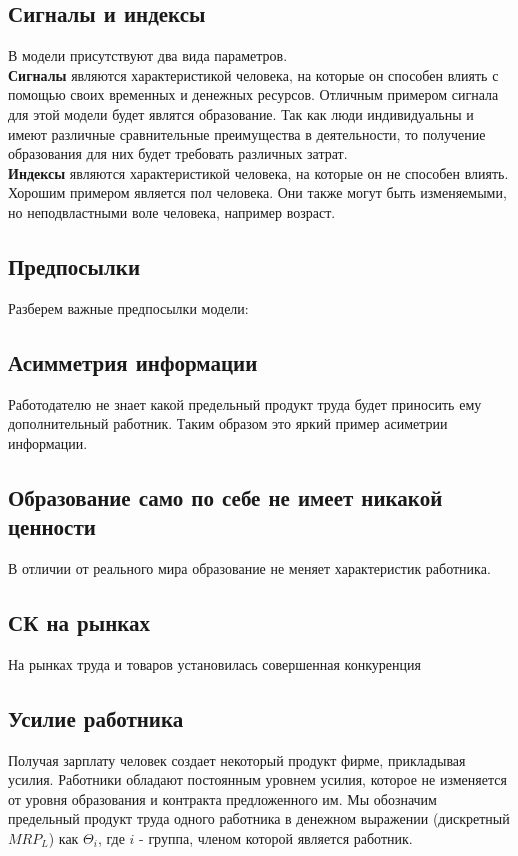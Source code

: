 \subsection{Сигналы и индексы}
\indent\setlength{\parindent}{1em}В модели присутствуют два вида параметров.\smallskip\\
\indent\setlength{\parindent}{1em}\textbf{Сигналы} являются характеристикой человека, на которые он способен влиять с помощью своих временных и денежных ресурсов. Отличным примером сигнала для этой модели будет являтся образование. Так как люди индивидуальны и имеют различные сравнительные преимущества в деятельности, то получение образования для них будет требовать различных затрат.\smallskip\\
\indent\setlength{\parindent}{1em}\textbf{Индексы} являются характеристикой человека, на которые он не способен влиять. Хорошим примером является пол человека. Они также могут быть изменяемыми, но неподвластными воле человека, например возраст.
\subsection{Предпосылки}
\indent\setlength{\parindent}{1em}Разберем важные предпосылки модели:
\subsection{Асимметрия информации}
\indent\setlength{\parindent}{1em}Работодателю не знает какой предельный продукт труда будет приносить ему дополнительный работник. Таким образом это яркий пример асиметрии информации.
\subsection{Образование само по себе не имеет никакой ценности}
\indent\setlength{\parindent}{1em}В отличии от реального мира образование не меняет характеристик работника.
\subsection{СК на рынках}
\indent\setlength{\parindent}{1em}На рынках труда и товаров установилась совершенная конкуренция
\subsection{Усилие работника}
\indent\setlength{\parindent}{1em}Получая зарплату человек создает некоторый продукт фирме, прикладывая усилия. Работники обладают постоянным уровнем усилия, которое не изменяется от уровня образования и контракта предложенного им. Мы обозначим предельный продукт труда одного работника в денежном выражении (дискретный $MRP_L$) как $\Theta_i$, где $i$ - группа, членом которой является работник. %

